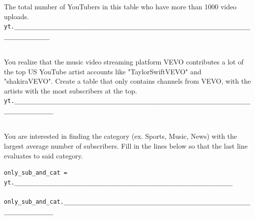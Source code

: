 \begin{enumerate}

 The total number of YouTubers in this table who have more than 1000 video uploads.\\

\lstinline{yt.________________________________________________________________________________} \\ \\

 You realize that the music video streaming platform VEVO contributes a lot of the top US YouTube artist accounts like "TaylorSwiftVEVO" and "shakiraVEVO". Create a table that only contains channels from VEVO, with the artists with the most subscribers at the top.\\

\lstinline{yt._________________________________________________________________________________} \\ \\

 You are interested in finding the category (ex. Sports, Music, News) with the largest average number of subscribers. Fill in the lines below so that the last line evaluates to said category.

\lstinline{only_sub_and_cat = yt.______________________________________________________________} \\ \\
\lstinline{only_sub_and_cat.___________________________________________________________________} \\ \\



\end{enumerate}
